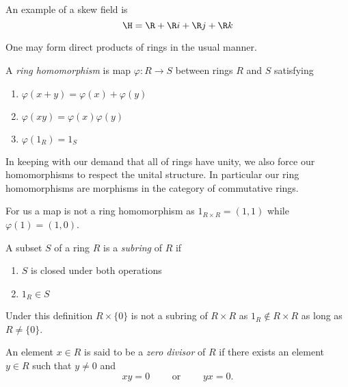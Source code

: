 \documentclass[master.tex]{subfiles}
\begin{document}
\begin{example*}
  An example of a skew field is
  \[\H = \R + \R i + \R j + \R k\]
\end{example*}

One may form direct products of rings in the usual manner.

\begin{defn*}
  A \emph{ring homomorphism} is map \(\varphi \colon R \to S\) between rings \(R\) and \(S\) satisfying
  \begin{enumerate}[label=(\arabic*)]
  \item \(\varphi(x+y)=\varphi(x)+\varphi(y)\)
  \item \(\varphi(xy)=\varphi(x)\varphi(y)\)
  \item \(\varphi(1_R)=1_S\)
  \end{enumerate}
\end{defn*}

In keeping with our demand that all of rings have unity, we also force our homomorphisms to respect the unital
structure. In particular our ring homomorphisms are morphisms in the category of commutative rings.

\begin{example*}
  For us a map  is not a ring homomorphism as
  \(1_{R \times R} = (1,1)\) while \(\varphi(1)=(1,0)\).
\end{example*}

\begin{defn*}
  A subset \(S\) of a ring \(R\) is a \emph{subring} of \(R\) if
  \begin{enumerate}[label=(\arabic*)]
  \item \(S\) is closed under both operations
  \item \(1_R \in S\)
  \end{enumerate}
\end{defn*}

\begin{example*}
  Under this definition \(R \times \{0\}\) is not a subring of \(R \times R\) as \(1_R \not \in R \times R\) as long as
  \(R\neq\{0\}\).
\end{example*}

\begin{defn*}
  An element \(x \in R\) is said to be a \emph{zero divisor} of \(R\) if there exists an element \(y \in R\) such that
  \(y \neq 0\) and
  \[xy = 0 \qquad \text{ or } \qquad yx = 0.\]
\end{defn*}
\end{document}
